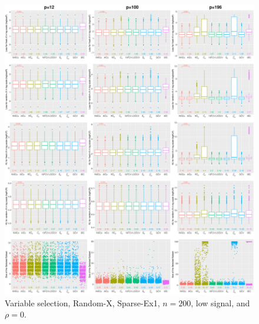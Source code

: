 \begin{figure}[!ht]
\centering
\includegraphics[width=\textwidth]{figures/supplement/randomx/subset_selection/Sparse-Ex1_n200_lsnr_rho0.eps}
\caption{Variable selection, Random-X, Sparse-Ex1, $n=200$, low signal, and $\rho=0$.}
\end{figure}
\clearpage
